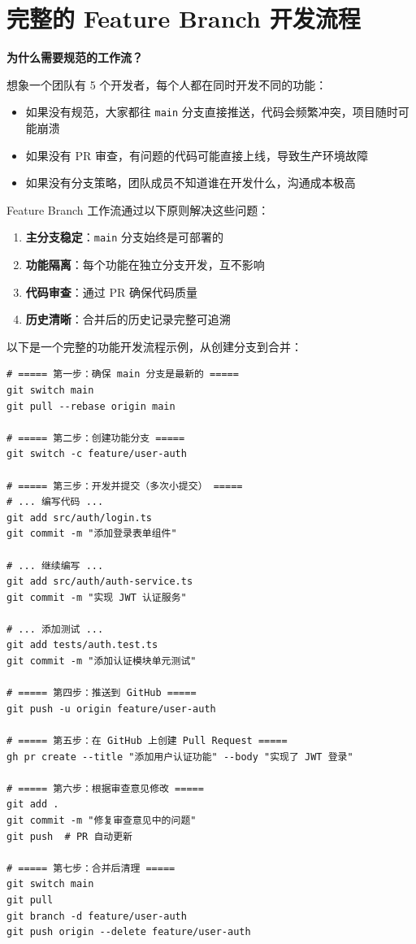 \documentclass[12pt,a4paper,openany]{ctexbook}
\begin{document}
\section{完整的 Feature Branch 开发流程}

\begin{infobox}
\textbf{为什么需要规范的工作流？}

想象一个团队有 5 个开发者，每个人都在同时开发不同的功能：
\begin{itemize}
  \item 如果没有规范，大家都往 \texttt{main} 分支直接推送，代码会频繁冲突，项目随时可能崩溃
  \item 如果没有 PR 审查，有问题的代码可能直接上线，导致生产环境故障
  \item 如果没有分支策略，团队成员不知道谁在开发什么，沟通成本极高
\end{itemize}

Feature Branch 工作流通过以下原则解决这些问题：
\begin{enumerate}
  \item \textbf{主分支稳定}：\texttt{main} 分支始终是可部署的
  \item \textbf{功能隔离}：每个功能在独立分支开发，互不影响
  \item \textbf{代码审查}：通过 PR 确保代码质量
  \item \textbf{历史清晰}：合并后的历史记录完整可追溯
\end{enumerate}
\end{infobox}

以下是一个完整的功能开发流程示例，从创建分支到合并：

\begin{lstlisting}[style=shell]
# ===== 第一步：确保 main 分支是最新的 =====
git switch main
git pull --rebase origin main

# ===== 第二步：创建功能分支 =====
git switch -c feature/user-auth

# ===== 第三步：开发并提交（多次小提交） =====
# ... 编写代码 ...
git add src/auth/login.ts
git commit -m "添加登录表单组件"

# ... 继续编写 ...
git add src/auth/auth-service.ts
git commit -m "实现 JWT 认证服务"

# ... 添加测试 ...
git add tests/auth.test.ts
git commit -m "添加认证模块单元测试"

# ===== 第四步：推送到 GitHub =====
git push -u origin feature/user-auth

# ===== 第五步：在 GitHub 上创建 Pull Request =====
gh pr create --title "添加用户认证功能" --body "实现了 JWT 登录"

# ===== 第六步：根据审查意见修改 =====
git add .
git commit -m "修复审查意见中的问题"
git push  # PR 自动更新

# ===== 第七步：合并后清理 =====
git switch main
git pull
git branch -d feature/user-auth
git push origin --delete feature/user-auth
\end{lstlisting}
\end{document}
